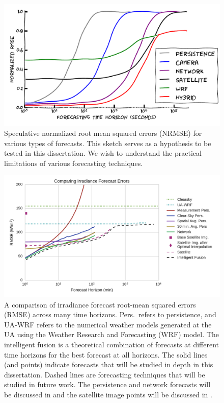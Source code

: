\begin{figure}[htbp]
\includegraphics[width=\textwidth]{figs/bullshit.pdf}
\caption[Speculative errors for various forecasting
techniques]{Speculative normalized root mean squared errors (NRMSE)
for various types of forecasts. This sketch serves as a hypothesis to
be tested in this dissertation. We wish to understand the practical
limitations of various forecasting techniques. }
\label{fig:bullshitplot}
\end{figure}

\begin{figure}[tbp]
\includegraphics[width=\textwidth]{figs/timehorizon.pdf}
\caption[Irradiance forecast errors across forecast horizons]{A
  comparison of irradiance forecast root-mean squared errors (RMSE)
  across many time horizons.  Pers.\ refers to persistence, and UA-WRF
  refers to the numerical weather models generated at the UA using the
  Weather Research and Forecasting (WRF) model. The intelligent fusion
  is a theoretical combination of forecasts at different time
  horizons for the best forecast at all horizons.  The solid lines
  (and points) indicate forecasts that will be studied in depth in this
  dissertation. Dashed lines are forecasting techniques that will be
  studied in future work.  The persistence and  network forecasts will
  be discussed in  and the satellite image points
  will be discussed in .}
\label{fig:newshitplot}
\end{figure}

